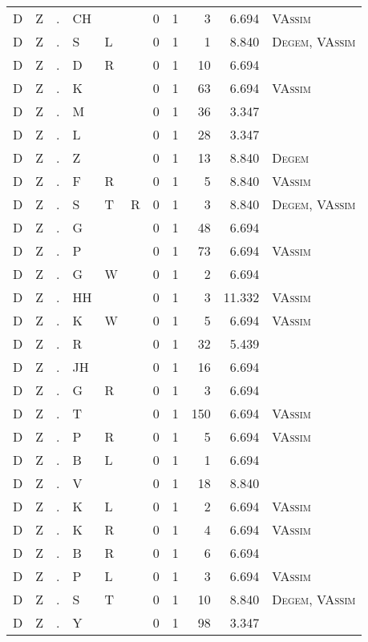 \begin{longtable}{r@{ } r@{ } c@{ } l@{ } l@{ } l@{ } r r r r l }
D & Z & . & CH &  &  & 0 & 1 & 3 & 6.694 & \textsc{VAssim} \\
D & Z & . & S & L &  & 0 & 1 & 1 & 8.840 & \textsc{Degem}, \textsc{VAssim} \\
D & Z & . & D & R &  & 0 & 1 & 10 & 6.694 &  \\
D & Z & . & K &  &  & 0 & 1 & 63 & 6.694 & \textsc{VAssim} \\
D & Z & . & M &  &  & 0 & 1 & 36 & 3.347 &  \\
D & Z & . & L &  &  & 0 & 1 & 28 & 3.347 &  \\
D & Z & . & Z &  &  & 0 & 1 & 13 & 8.840 & \textsc{Degem} \\
D & Z & . & F & R &  & 0 & 1 & 5 & 8.840 & \textsc{VAssim} \\
D & Z & . & S & T & R & 0 & 1 & 3 & 8.840 & \textsc{Degem}, \textsc{VAssim} \\
D & Z & . & G &  &  & 0 & 1 & 48 & 6.694 &  \\
D & Z & . & P &  &  & 0 & 1 & 73 & 6.694 & \textsc{VAssim} \\
D & Z & . & G & W &  & 0 & 1 & 2 & 6.694 &  \\
D & Z & . & HH &  &  & 0 & 1 & 3 & 11.332 & \textsc{VAssim} \\
D & Z & . & K & W &  & 0 & 1 & 5 & 6.694 & \textsc{VAssim} \\
D & Z & . & R &  &  & 0 & 1 & 32 & 5.439 &  \\
D & Z & . & JH &  &  & 0 & 1 & 16 & 6.694 &  \\
D & Z & . & G & R &  & 0 & 1 & 3 & 6.694 &  \\
D & Z & . & T &  &  & 0 & 1 & 150 & 6.694 & \textsc{VAssim} \\
D & Z & . & P & R &  & 0 & 1 & 5 & 6.694 & \textsc{VAssim} \\
D & Z & . & B & L &  & 0 & 1 & 1 & 6.694 &  \\
D & Z & . & V &  &  & 0 & 1 & 18 & 8.840 &  \\
D & Z & . & K & L &  & 0 & 1 & 2 & 6.694 & \textsc{VAssim} \\
D & Z & . & K & R &  & 0 & 1 & 4 & 6.694 & \textsc{VAssim} \\
D & Z & . & B & R &  & 0 & 1 & 6 & 6.694 &  \\
D & Z & . & P & L &  & 0 & 1 & 3 & 6.694 & \textsc{VAssim} \\
D & Z & . & S & T &  & 0 & 1 & 10 & 8.840 & \textsc{Degem}, \textsc{VAssim} \\
D & Z & . & Y &  &  & 0 & 1 & 98 & 3.347 &  \\

\end{longtable}
